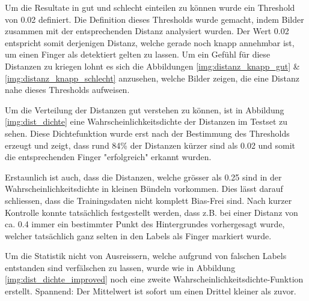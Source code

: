 Um die Resultate in gut und schlecht einteilen zu können wurde ein Threshold von 0.02 definiert.
Die Definition dieses Thresholds wurde gemacht, indem Bilder zusammen mit der entsprechenden Distanz analysiert wurden.
Der Wert 0.02 entspricht somit derjenigen Distanz, welche gerade noch knapp annehmbar ist, um einen Finger als detektiert gelten zu lassen.
Um ein Gefühl für diese Distanzen zu kriegen lohnt es sich die Abbildungen \ref{img:distanz_knapp_gut} \& \ref{img:distanz_knapp_schlecht} anzusehen, welche Bilder zeigen, die eine Distanz nahe dieses Thresholds aufweisen. 

Um die Verteilung der Distanzen gut verstehen zu können, ist in Abbildung \ref{img:dist_dichte} eine Wahrscheinlichkeitsdichte der Distanzen im Testset zu sehen. Diese Dichtefunktion wurde erst nach der Bestimmung des Thresholds erzeugt und zeigt, dass rund 84\% der Distanzen kürzer sind als 0.02 und somit die entsprechenden Finger "erfolgreich" erkannt wurden.

Erstaunlich ist auch, dass die Distanzen, welche grösser als 0.25 sind in der Wahrscheinlichkeitsdichte in kleinen Bündeln vorkommen. 
Dies lässt darauf schliessen, dass die Trainingsdaten nicht komplett Bias-Frei sind.
Nach kurzer Kontrolle konnte tatsächlich festgestellt werden, dass z.B. bei einer Distanz von ca. 0.4 immer ein bestimmter Punkt des Hintergrundes vorhergesagt wurde, welcher tatsächlich ganz selten in den Labels als Finger markiert wurde. 

Um die Statistik nicht von Ausreissern, welche aufgrund von falschen Labels entstanden sind verfälschen zu lassen, wurde wie in Abbildung \ref{img:dist_dichte_improved} noch eine zweite Wahrscheinlichkeitsdichte-Funktion erstellt. Spannend: Der Mittelwert ist sofort um einen Drittel kleiner als zuvor. 

